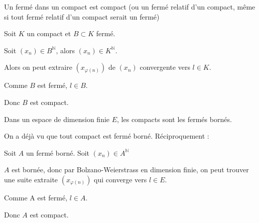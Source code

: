 \documentclass[a4paper,12pt]{book}
\newcommand{\Thr}[2]{\begin{tcolorbox}[sharp corners, colback=white,colframe=red!90!black!75, title=Théorème : #1]#2\end{tcolorbox}}
\newcommand{\Prop}[2]{\begin{tcolorbox}[sharp corners, colback=white,colframe=red!90!black!75, title=Proposition : #1]#2\end{tcolorbox}}
\newcommand{\Pre}[1]{\begin{tcolorbox}[sharp corners, colback=white,colframe=green!60!green!30!black!75, title=Preuve]#1\end{tcolorbox}}
\def\N{\mathbb{N}}
\begin{document}
\Prop{Fermé d'un compact}{Un fermé dans un compact est compact (ou un fermé relatif d'un compact, même si tout fermé relatif d'un compact serait un fermé)}
\Pre{Soit $K$ un compact et $B\subset K$ fermé. \par Soit $(x_n)\in B^\N$, alors $(x_n)\in K^\N$. \par Alors on peut extraire $(x_{\varphi(n)})$ de $(x_n)$ convergente vers $l\in K$. \par Comme $B$ est fermé, $l\in B$. \par Donc $B$ est compact.}
\Thr{Compacts}{Dans un espace de dimension finie $E$, les compacts sont les fermés bornés.}
\Pre{On a déjà vu que tout compact est fermé borné. Réciproquement : \par Soit $A$ un fermé borné. Soit $(x_n)\in A^\N$ \par $A$ est bornée, donc par Bolzano-Weierstrass en dimension finie, on peut trouver une suite extraite $(x_{\varphi(n)})$ qui converge vers $l\in E$. \par Comme A est fermé, $l\in A$. \par Donc $A$ est compact.}
\end{document}
